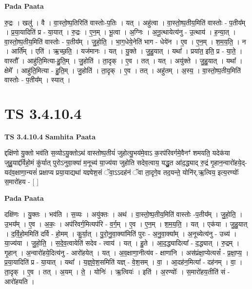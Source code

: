\documentclass[17pt]{extarticle}
\begin{document}
\textbf{Pada Paata} \newline

रु॒द्रः । खलु॑ । वै । वा॒स्तो॒ष्प॒तिरिति॑ वास्तोः-प॒तिः । यत् । अहु॑त्वा । वा॒स्तो॒ष्प॒तीय॒मिति॑ वास्तोः - प॒तीय᳚म् । प्र॒या॒यादिति॑ प्र - या॒यात् । रु॒द्रः । ए॒न॒म् । भू॒त्वा । अ॒ग्निः । अ॒नू॒त्थायेत्य॑नु - उ॒त्थाय॑ । ह॒न्या॒त् । वा॒स्तो॒ष्प॒तीय॒मिति॑ वास्तोः - प॒तीय᳚म् । जु॒हो॒ति॒ । भा॒ग॒धेये॒नेति॑ भाग - धेये॑न । ए॒व । ए॒न॒म् । श॒म॒य॒ति॒ । न । आर्ति᳚म् । एति॑ । ऋ॒च्छ॒ति॒ । यज॑मानः । यत् । यु॒क्ते । जु॒हु॒यात् । यथा᳚ । प्रया॑त॒ इति॒ प्र - या॒ते॒ । वास्तौ᳚ । आहु॑ति॒मित्या-हु॒ति॒म् । जु॒होति॑ । ता॒दृक् । ए॒व । तत् । यत् । अयु॑क्ते । जु॒हु॒यात् । यथा᳚ । क्षेमे᳚ । आहु॑ति॒मित्या - हु॒ति॒म् । जु॒होति॑ । ता॒दृक् । ए॒व । तत् । अहु॑तम् । अ॒स्य॒ । वा॒स्तो॒ष्प॒तीय॒मिति॑ वास्तोः - प॒तीय᳚म् । स्यात् ।  \newline





\section{ TS 3.4.10.4 }

\textbf{TS 3.4.10.4 } \newline
\textbf{Samhita Paata} \newline

द्दक्षि॑णो यु॒क्तो भव॑ति स॒व्योऽयु॒क्तोऽथ॑ वास्तोष्प॒तीयं॑ जुहोत्यु॒भय॑मे॒वाऽ क॒रप॑रिवर्गमे॒वैनꣳ॑ शमयति॒ यदेक॑या जुहु॒याद्द॑र्विहो॒मं कु॑र्यात् पुरोऽनुवा॒क्या॑ म॒नूच्य॑ या॒ज्य॑या जुहोति सदेव॒त्वाय॒ यद्धु॒त आ॑द॒द्ध्याद् रु॒द्रं गृ॒हान॒न्वारो॑हये॒द्-यद॑व॒क्षाणा॒न्यसं॑ प्रक्षाप्य प्रया॒याद्यथा॑ यज्ञ्वेश॒सं ॅवा॒ऽऽदह॑नं ॅवा ता॒दृगे॒व तद॒यन्ते॒ योनि॑र्.ऋ॒त्विय॒ इत्य॒रण्योः᳚ स॒मारो॑हय - [  ] \newline

\textbf{Pada Paata} \newline

दक्षि॑णः । यु॒क्तः । भव॑ति । स॒व्यः । अयु॑क्तः । अथ॑ । वा॒स्तो॒ष्प॒तीय॒मिति॑ वास्तोः -प॒तीय᳚म् । जु॒हो॒ति॒ । उ॒भय᳚म् । ए॒व । अ॒कः॒ । अप॑रिवर्ग॒मित्यप॑रि - व॒र्ग॒म् । ए॒व । ए॒न॒म् । श॒म॒य॒ति॒ । यत् । एक॑या । जु॒हु॒यात् । द॒र्वि॒हो॒ममिति॑ दर्वि - हो॒मम् । कु॒र्या॒त् । पु॒रो॒नु॒वा॒क्या॑मिति॑ पुरः - अ॒नु॒वा॒क्या᳚म् । अ॒नूच्येत्य॑नु - उच्य॑ । या॒ज्य॑या । जु॒हो॒ति॒ । स॒दे॒व॒त्वायेति॑ सदेव - त्वाय॑ । यत् । हु॒ते । आ॒द॒द्ध्यादित्या᳚ - द॒द्ध्यात् । रु॒द्रम् । गृ॒हान् । अ॒न्वारो॑हये॒दित्य॑नु - आरो॑हयेत् । यत् । अ॒व॒क्षाणा॒नीत्य॑व - क्षाणा॑नि । अस॑प्रंक्षा॒प्येत्यसं᳚ - प्र॒क्षा॒प्य॒ । प्र॒या॒यादिति॑ प्र - या॒यात् । यथा᳚ । य॒ज्ञ्॒वे॒श॒समिति॑ यज्ञ् - वे॒श॒सम् । वा॒ । आ॒दह॑न॒मित्या᳚ - दह॑नम् । वा॒ । ता॒दृक् । ए॒व । तत् । अ॒यम् । ते॒ । योनिः॑ । ऋ॒त्वियः॑ । इति॑ । अ॒रण्योः᳚ । स॒मारो॑हय॒तीति॑ सं - आरो॑हयति ।  \newline
\end{document}
